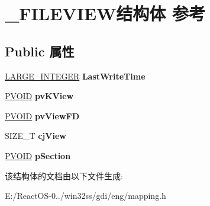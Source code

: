 \hypertarget{struct___f_i_l_e_v_i_e_w}{}\section{\+\_\+\+F\+I\+L\+E\+V\+I\+E\+W结构体 参考}
\label{struct___f_i_l_e_v_i_e_w}
\subsection*{Public 属性}
\begin{DoxyCompactItemize}
\item 
\mbox{\label{struct___f_i_l_e_v_i_e_w_a5d86e8aa3b834324a60db20961029c47}} 
\hyperlink{union___l_a_r_g_e___i_n_t_e_g_e_r}{L\+A\+R\+G\+E\+\_\+\+I\+N\+T\+E\+G\+ER} {\bfseries Last\+Write\+Time}
\item 
\mbox{\label{struct___f_i_l_e_v_i_e_w_a000de60110257698a55a5dd08abdf5e0}} 
\hyperlink{interfacevoid}{P\+V\+O\+ID} {\bfseries pv\+K\+View}
\item 
\mbox{\label{struct___f_i_l_e_v_i_e_w_a9608cc73fdc94b45db3e22671f2a9cbb}} 
\hyperlink{interfacevoid}{P\+V\+O\+ID} {\bfseries pv\+View\+FD}
\item 
\mbox{\label{struct___f_i_l_e_v_i_e_w_abb55c5270a8b6456e4bc1a36b6a54c05}} 
S\+I\+Z\+E\+\_\+T {\bfseries cj\+View}
\item 
\mbox{\label{struct___f_i_l_e_v_i_e_w_aac538d8141a8d7da1b79bd4cbf25d1d7}} 
\hyperlink{interfacevoid}{P\+V\+O\+ID} {\bfseries p\+Section}
\end{DoxyCompactItemize}


该结构体的文档由以下文件生成\+:\begin{DoxyCompactItemize}
\item 
E\+:/\+React\+O\+S-\/0../win32ss/gdi/eng/mapping.\+h\end{DoxyCompactItemize}
